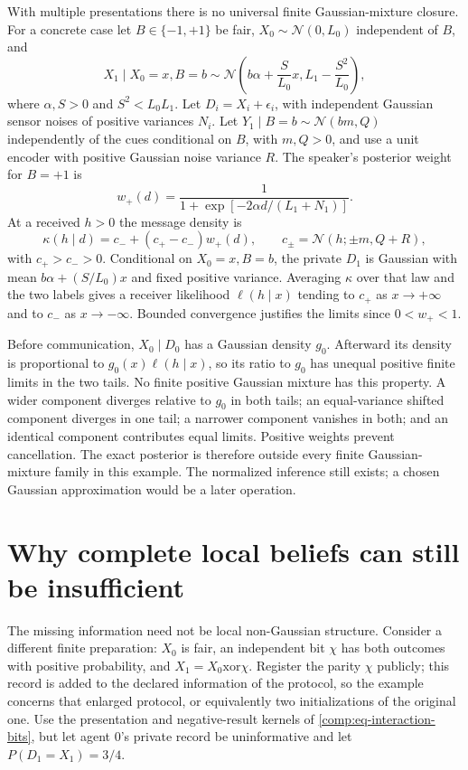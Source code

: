 With multiple presentations there is no universal finite Gaussian-mixture closure. For a concrete case let $B\in\{-1,+1\}$ be fair, $X_0\sim\mathcal N(0,L_0)$ independent of $B$, and
\begin{equation}
X_1\mid X_0=x,B=b
\sim\mathcal N\left(b\alpha+\frac{S}{L_0}x,
L_1-\frac{S^2}{L_0}\right),
\end{equation}
where $\alpha,S>0$ and $S^2<L_0L_1$. Let $D_i=X_i+\epsilon_i$, with independent Gaussian sensor noises of positive variances $N_i$. Let $Y_1\mid B=b\sim\mathcal N(bm,Q)$ independently of the cues conditional on $B$, with $m,Q>0$, and use a unit encoder with positive Gaussian noise variance $R$. The speaker's posterior weight for $B=+1$ is
\begin{equation}
w_+(d)=\frac{1}{1+\exp[-2\alpha d/(L_1+N_1)]}.
\end{equation}
At a received $h>0$ the message density is
\begin{equation}
\kappa(h\mid d)=c_-+(c_+-c_-)w_+(d),\qquad
c_\pm=\mathcal N(h;\pm m,Q+R),
\end{equation}
with $c_+>c_->0$. Conditional on $X_0=x,B=b$, the private $D_1$ is Gaussian with mean $b\alpha+(S/L_0)x$ and fixed positive variance. Averaging $\kappa$ over that law and the two labels gives a receiver likelihood $\ell(h\mid x)$ tending to $c_+$ as $x\to+\infty$ and to $c_-$ as $x\to-\infty$. Bounded convergence justifies the limits since $0<w_+<1$.

Before communication, $X_0\mid D_0$ has a Gaussian density $g_0$. Afterward its density is proportional to $g_0(x)\ell(h\mid x)$, so its ratio to $g_0$ has unequal positive finite limits in the two tails. No finite positive Gaussian mixture has this property. A wider component diverges relative to $g_0$ in both tails; an equal-variance shifted component diverges in one tail; a narrower component vanishes in both; and an identical component contributes equal limits. Positive weights prevent cancellation. The exact posterior is therefore outside every finite Gaussian-mixture family in this example. The normalized inference still exists; a chosen Gaussian approximation would be a later operation.

\section{Why complete local beliefs can still be insufficient}
\label{comp:interaction-local-loss}

The missing information need not be local non-Gaussian structure. Consider a different finite preparation: $X_0$ is fair, an independent bit $\chi$ has both outcomes with positive probability, and $X_1=X_0\mathbin{\mathrm{xor}}\chi$. Register the parity $\chi$ publicly; this record is added to the declared information of the protocol, so the example concerns that enlarged protocol, or equivalently two initializations of the original one. Use the presentation and negative-result kernels of \cref{comp:eq-interaction-bits}, but let agent 0's private record be uninformative and let $P(D_1=X_1)=3/4$.


